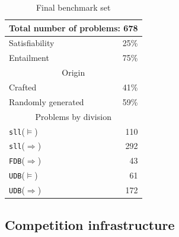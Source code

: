 \documentclass[twoside,11pt]{article}
\newcommand{\limp}{\Rightarrow}
\newcommand{\sllsat}{\texttt{sll}($\models$)}
\newcommand{\sllent}{\texttt{sll}($\limp$)}
\newcommand{\FDBent}{\texttt{FDB}($\limp$)}
\newcommand{\UDBsat}{\texttt{UDB}($\models$)}
\newcommand{\UDBent}{\texttt{UDB}($\limp$)}
\begin{document}
\begin{table}
\begin{center}
\begin{tabular}{p{6cm}r}\hline
\multicolumn{2}{c}{Total number of problems: 678} \\
\hline
Satisfiability & 25\% \\
Entailment & 75\% \\
\hline
%
\hline
\multicolumn{2}{c}{Origin} \\
\hline
Crafted & 41\% \\
Randomly generated & 59\% \\
\hline
%
\hline
\multicolumn{2}{c}{Problems by division} \\
\hline
\sllsat & 110 \\ %
\sllent & 292 \\ %
\FDBent &  43 \\ %
\UDBsat &  61 \\ %
\UDBent & 172 \\
\hline
\end{tabular}
\end{center}
\caption{Final benchmark set}
\label{tab:bench}
\vspace{-3eX}
\end{table}


\subsection{Competition infrastructure}
\end{document}
